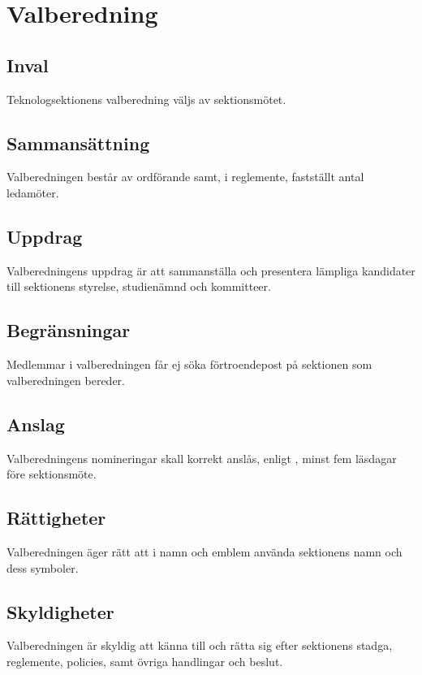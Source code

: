 \section{Valberedning}

\subsection{Inval}
Teknologsektionens valberedning väljs av sektionsmötet.

\subsection{Sammansättning}
Valberedningen består av ordförande samt, i reglemente, fastställt antal ledamöter. 

\subsection{Uppdrag}
Valberedningens uppdrag är att sammanställa och presentera lämpliga kandidater
till sektionens styrelse, studienämnd och kommitteer.

\subsection{Begränsningar}
Medlemmar i valberedningen får ej söka förtroendepost på sektionen som valberedningen bereder.

\subsection{Anslag}
Valberedningens nomineringar skall korrekt anslås, enligt , minst fem läsdagar före sektionsmöte.

\subsection{Rättigheter}
Valberedningen äger rätt att i namn och emblem använda sektionens namn och dess symboler.

\subsection{Skyldigheter}
Valberedningen är skyldig att känna till och rätta sig efter sektionens stadga, reglemente, policies, samt övriga handlingar och beslut.